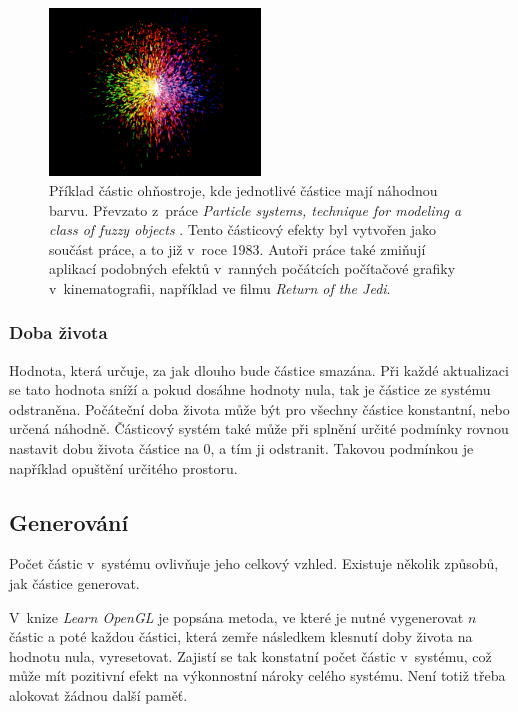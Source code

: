 \begin{figure}[H]
	\centering
	\includegraphics[width=0.5\textwidth]{obrazky-figures/particles_old.png}
	\caption{Příklad částic ohňostroje, kde jednotlivé částice mají náhodnou barvu. Převzato z~práce \emph{Particle systems, technique for modeling a class of fuzzy objects} \cite{reeves1983particle}. Tento částicový efekty byl vytvořen jako součást práce, a to již v~roce 1983. Autoři práce také zmiňují aplikací podobných efektů v~ranných počátcích počítačové grafiky v~kinematografii, například ve filmu \emph{Return of the Jedi}.  }
	\label{fig:particles_color_expample}
\end{figure}

\subsubsection*{Doba života} Hodnota, která určuje, za jak dlouho bude částice smazána. Při každé aktualizaci se tato hodnota sníží a pokud dosáhne hodnoty nula, tak je částice ze systému odstraněna. Počáteční doba života může být pro všechny částice konstantní, nebo určená náhodně. Částicový systém také může při splnění určité podmínky rovnou nastavit dobu života částice na 0, a tím ji odstranit. Takovou podmínkou je například opuštění určitého prostoru.

\subsection{Generování}
Počet částic v~systému ovlivňuje jeho celkový vzhled. Existuje několik způsobů, jak částice generovat. 

V~knize \emph{Learn OpenGL} \cite{de2020learn} je popsána metoda, ve které je nutné vygenerovat \(n\) částic a poté každou částici, která zemře následkem klesnutí doby života na hodnotu nula, vyresetovat. Zajistí se tak konstatní počet částic v~systému, což může mít pozitivní efekt na výkonnostní nároky celého systému. Není totiž třeba alokovat žádnou další paměť.

